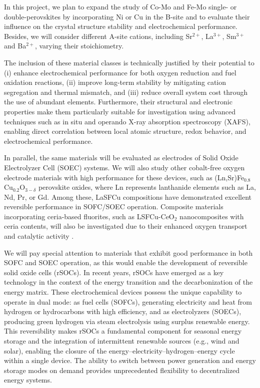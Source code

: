 In this project, we plan to expand the study of Co-Mo and Fe-Mo single- or double-perovskites by incorporating Ni or Cu in the B-site and to evaluate their influence on the crystal structure stability and electrochemical performance. Besides, we will consider different A-site cations, including Sr$^{2+}$, La$^{3+}$, Sm$^{3+}$ and Ba$^{2+}$, varying their stoichiometry.  

The inclusion of these material classes is technically justified by their potential to (i) enhance electrochemical performance for both oxygen reduction and fuel oxidation reactions, (ii) improve long-term stability by mitigating cation segregation and thermal mismatch, and (iii) reduce overall system cost through the use of abundant elements. Furthermore, their structural and electronic properties make them particularly suitable for investigation using advanced techniques such as in situ and operando X-ray absorption spectroscopy (XAFS), enabling direct correlation between local atomic structure, redox behavior, and electrochemical performance.


In parallel, the same materials will be evaluated as electrodes of Solid Oxide Electrolyzer Cell (SOEC) systems. We will also study other cobalt-free oxygen electrode materials with high performance for these devices, such as (Ln,Sr)Fe$_{0.8}$Cu$_{0.2}$O$_{3-\delta}$ perovskite oxides, where Ln represents lanthanide elements such as La, Nd, Pr, or Gd. Among these, LaSFCu compositions have demonstrated excellent reversible performance in SOFC/SOEC operation. Composite materials incorporating ceria-based fluorites, such as LSFCu-CeO$_2$ nanocomposites with ceria contents, will also be investigated due to their enhanced oxygen transport and catalytic activity \cite{Natasha2026}.

We will pay special attention to materials that exhibit good performance in both SOFC and SOEC operation, as this would enable the development of reversible solid oxide cells (rSOCs). In recent years, rSOCs have emerged as a key technology in the context of the energy transition and the decarbonization of the energy matrix. These electrochemical devices possess the unique capability to operate in dual mode: as fuel cells (SOFCs), generating electricity and heat from hydrogen or hydrocarbons with high efficiency, and as electrolyzers (SOECs), producing green hydrogen via steam electrolysis using surplus renewable energy. This reversibility makes rSOCs a fundamental component for seasonal energy storage and the integration of intermittent renewable sources (e.g., wind and solar), enabling the closure of the energy–electricity–hydrogen–energy cycle within a single device. The ability to switch between power generation and energy storage modes on demand provides unprecedented flexibility to decentralized energy systems.

